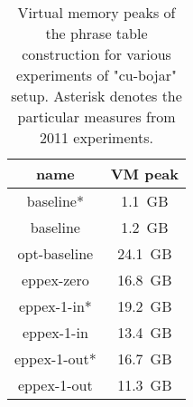 \begin{table}[ht]
\centering
\begin{tabular}{ | c | c | }
\hline
name & VM peak \\
\hline
\hline
baseline*    & 1.1~GB \\
baseline     & 1.2~GB \\
opt-baseline & 24.1~GB \\
eppex-zero   & 16.8~GB \\
\hline
eppex-1-in*  & 19.2~GB \\
eppex-1-in   & 13.4~GB \\
\hline
eppex-1-out* & 16.7~GB \\
eppex-1-out  & 11.3~GB \\
\hline
\end{tabular}
\caption{\label{cu-bojar-vm-peak-benchmarks}Virtual memory peaks of
the phrase table construction for various experiments of "cu-bojar" setup.
Asterisk denotes the particular measures from 2011 experiments.}
\end{table}
